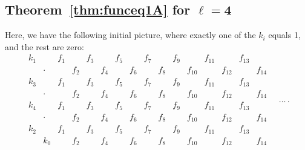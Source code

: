 \documentclass[10pt,a4paper]{amsart}
\numberwithin{equation}{section}
\theoremstyle{definition}
\begin{document}
\subsection[Theorem~\ref{thm:funceq1A} for l=4]{Theorem~\ref{thm:funceq1A} for $\boldsymbol{\ell=4}$}\label{subsec:combspec}

Here, we have the following initial picture, where exactly one of the $k_i$ equals 1, and the rest are zero:
\begin{equation*}
\begin{matrix}
k_1 && f_1 && f_3 && f_5 && f_7 && f_9 && f_{11} && f_{13} & \\
& \cdot && f_2 && f_4 && f_6 && f_8 && f_{10} && f_{12} && f_{14} \\
k_3 && f_1 && f_3 && f_5 && f_7 && f_9 && f_{11} && f_{13} & \\
& \cdot && f_2 && f_4 && f_6 && f_8 && f_{10} && f_{12} && f_{14} \\
k_4 && f_1 && f_3 && f_5 && f_7 && f_9 && f_{11} && f_{13} & \\
& \cdot && f_2 && f_4 && f_6 && f_8 && f_{10} && f_{12} && f_{14} \\
k_2 && f_1 && f_3 && f_5 && f_7 && f_9 && f_{11} && f_{13} & \\
& k_0 && f_2 && f_4 && f_6 && f_8 && f_{10} && f_{12} && f_{14}
 \end{matrix}\quad\dots\,.
\end{equation*}
\end{document}
